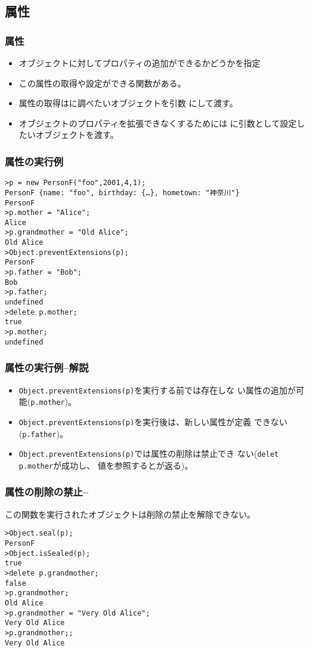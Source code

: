 \subsection{\protect{}属性}
\begin{frame}[containsverbatim]
 \frametitle{\protect{}属性}
\begin{itemize}
 \item オブジェクトに対してプロパティの追加ができるかどうかを指定
 \item この属性の取得や設定ができる関数がある。
 \item 属性の取得はに調べたいオブジェクトを引数
にして渡す。
 \item オブジェクトのプロパティを拡張できなくするためには
に引数として設定したいオブジェクトを渡す。
\end{itemize} 
\end{frame}
\begin{frame}[containsverbatim]
 \frametitle{\protect{}属性の実行例}
 {\scriptsize
 \begin{Verbatim}
>p = new PersonF("foo",2001,4,1);
PersonF {name: "foo", birthday: {…}, hometown: "神奈川"}
PersonF
>p.mother = "Alice";
Alice
>p.grandmother = "Old Alice";
Old Alice
>Object.preventExtensions(p);
PersonF
>p.father = "Bob";
Bob
>p.father;
undefined
>delete p.mother;
true
>p.mother;
undefined
\end{Verbatim}
}
\end{frame}
\begin{frame}[containsverbatim]
\frametitle{\protect{}属性の実行例--解説}
\begin{itemize}
 \item \texttt{Object.preventExtensions(p)}を実行する前では存在しな
       い属性の追加が可能(\texttt{p.mother})。
 \item \texttt{Object.preventExtensions(p)}を実行後は、新しい属性が定義
			 できない(\texttt{p.father})。
 \item \texttt{Object.preventExtensions(p)}では属性の削除は禁止でき
       ない(\texttt{delet p.mother}が成功し、
			 値を参照するとが返る)。
\end{itemize}
\end{frame}
\begin{frame}[containsverbatim]
 \frametitle{属性の削除の禁止--\protect{}}
 この関数を実行されたオブジェクトは削除の禁止を解除できない。
 {\scriptsize
\begin{Verbatim}
>Object.seal(p);
PersonF
>Object.isSealed(p);
true
>delete p.grandmother;
false
>p.grandmother;
Old Alice
>p.grandmother = "Very Old Alice";
Very Old Alice
>p.grandmother;;
Very Old Alice
\end{Verbatim}
}
\end{frame}
